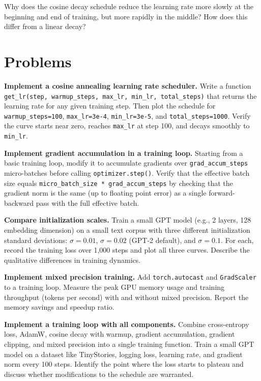\begin{reviewquestion}[13]
  Why does the cosine decay schedule reduce the learning rate more slowly at the beginning and end of training, but more rapidly in the middle? How does this differ from a linear decay?
\end{reviewquestion}

\section*{Problems}

\begin{problem}[1]
  \textbf{Implement a cosine annealing learning rate scheduler.} Write a function \texttt{get\_lr(step, warmup\_steps, max\_lr, min\_lr, total\_steps)} that returns the learning rate for any given training step. Then plot the schedule for \texttt{warmup\_steps=100}, \texttt{max\_lr=3e-4}, \texttt{min\_lr=3e-5}, and \texttt{total\_steps=1000}. Verify the curve starts near zero, reaches \texttt{max\_lr} at step 100, and decays smoothly to \texttt{min\_lr}.
\end{problem}

\begin{problem}[2]
  \textbf{Implement gradient accumulation in a training loop.} Starting from a basic training loop, modify it to accumulate gradients over \texttt{grad\_accum\_steps} micro-batches before calling \texttt{optimizer.step()}. Verify that the effective batch size equals \texttt{micro\_batch\_size * grad\_accum\_steps} by checking that the gradient norm is the same (up to floating point error) as a single forward-backward pass with the full effective batch.
\end{problem}

\begin{problem}[3]
  \textbf{Compare initialization scales.} Train a small GPT model (e.g., 2 layers, 128 embedding dimension) on a small text corpus with three different initialization standard deviations: $\sigma = 0.01$, $\sigma = 0.02$ (GPT-2 default), and $\sigma = 0.1$. For each, record the training loss over 1,000 steps and plot all three curves. Describe the qualitative differences in training dynamics.
\end{problem}

\begin{problem}[4]
  \textbf{Implement mixed precision training.} Add \texttt{torch.autocast} and \texttt{GradScaler} to a training loop. Measure the peak GPU memory usage and training throughput (tokens per second) with and without mixed precision. Report the memory savings and speedup ratio.
\end{problem}

\begin{problem}[5]
  \textbf{Implement a training loop with all components.} Combine cross-entropy loss, AdamW, cosine decay with warmup, gradient accumulation, gradient clipping, and mixed precision into a single training function. Train a small GPT model on a dataset like TinyStories, logging loss, learning rate, and gradient norm every 100 steps. Identify the point where the loss starts to plateau and discuss whether modifications to the schedule are warranted.
\end{problem}
